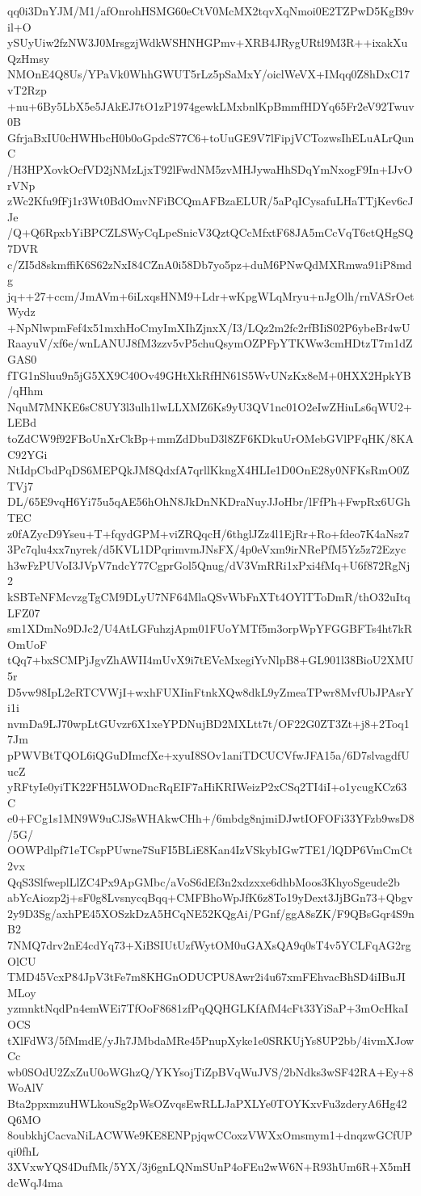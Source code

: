 qq0i3DnYJM/M1/afOnrohHSMG60eCtV0McMX2tqvXqNmoi0E2TZPwD5KgB9vil+O
ySUyUiw2fzNW3J0MrsgzjWdkWSHNHGPmv+XRB4JRygURtl9M3R++ixakXuQzHmsy
NMOnE4Q8Us/YPaVk0WhhGWUT5rLz5pSaMxY/oiclWeVX+IMqq0Z8hDxC17vT2Rzp
+nu+6By5LbX5e5JAkEJ7tO1zP1974gewkLMxbnlKpBmmfHDYq65Fr2eV92Twuv0B
GfrjaBxIU0cHWHbcH0b0oGpdcS77C6+toUuGE9V7lFipjVCTozwsIhELuALrQunC
/H3HPXovkOcfVD2jNMzLjxT92lFwdNM5zvMHJywaHhSDqYmNxogF9In+IJvOrVNp
zWc2Kfu9fFj1r3Wt0BdOmvNFiBCQmAFBzaELUR/5aPqICysafuLHaTTjKev6cJJe
/Q+Q6RpxbYiBPCZLSWyCqLpeSnicV3QztQCcMfxtF68JA5mCcVqT6ctQHgSQ7DVR
c/ZI5d8skmffiK6S62zNxI84CZnA0i58Db7yo5pz+duM6PNwQdMXRmwa91iP8mdg
jq++27+ccm/JmAVm+6iLxqsHNM9+Ldr+wKpgWLqMryu+nJgOlh/rnVASrOetWydz
+NpNlwpmFef4x51mxhHoCmyImXIhZjnxX/I3/LQz2m2fc2rfBIiS02P6ybeBr4wU
RaayuV/xf6e/wnLANUJ8fM3zzv5vP5chuQsymOZPFpYTKWw3cmHDtzT7m1dZGAS0
fTG1nSluu9n5jG5XX9C40Ov49GHtXkRfHN61S5WvUNzKx8eM+0HXX2HpkYB/qHhm
NquM7MNKE6sC8UY3l3ulh1lwLLXMZ6Ks9yU3QV1nc01O2eIwZHiuLs6qWU2+LEBd
toZdCW9f92FBoUnXrCkBp+mmZdDbuD3l8ZF6KDkuUrOMebGVlPFqHK/8KAC92YGi
NtIdpCbdPqDS6MEPQkJM8QdxfA7qrllKkngX4HLIe1D0OnE28y0NFKsRmO0ZTVj7
DL/65E9vqH6Yi75u5qAE56hOhN8JkDnNKDraNuyJJoHbr/lFfPh+FwpRx6UGhTEC
z0fAZycD9Yseu+T+fqydGPM+viZRQqcH/6thglJZz4l1EjRr+Ro+fdeo7K4aNsz7
3Pc7qlu4xx7nyrek/d5KVL1DPqrimvmJNsFX/4p0eVxm9irNRePfM5Yz5z72Ezyc
h3wFzPUVoI3JVpV7ndcY77CgprGol5Qnug/dV3VmRRi1xPxi4fMq+U6f872RgNj2
kSBTeNFMcvzgTgCM9DLyU7NF64MlaQSvWbFnXTt4OYlTToDmR/thO32uItqLFZ07
sm1XDmNo9DJc2/U4AtLGFuhzjApm01FUoYMTf5m3orpWpYFGGBFTs4ht7kROmUoF
tQq7+bxSCMPjJgvZhAWII4mUvX9i7tEVcMxegiYvNlpB8+GL901l38BioU2XMU5r
D5vw98IpL2eRTCVWjI+wxhFUXIinFtnkXQw8dkL9yZmeaTPwr8MvfUbJPAsrYi1i
nvmDa9LJ70wpLtGUvzr6X1xeYPDNujBD2MXLtt7t/OF22G0ZT3Zt+j8+2Toq17Jm
pPWVBtTQOL6iQGuDImcfXe+xyuI8SOv1aniTDCUCVfwJFA15a/6D7slvagdfUucZ
yRFtyIe0yiTK22FH5LWODncRqEIF7aHiKRIWeizP2xCSq2TI4iI+o1ycugKCz63C
e0+FCg1s1MN9W9uCJSsWHAkwCHh+/6mbdg8njmiDJwtIOFOFi33YFzb9wsD8/5G/
OOWPdlpf71eTCspPUwne7SuFI5BLiE8Kan4IzVSkybIGw7TE1/lQDP6VmCmCt2vx
QqS3SlfweplLlZC4Px9ApGMbc/aVoS6dEf3n2xdzxxe6dhbMoos3KhyoSgeude2b
abYcAiozp2j+sF0g8LvsnycqBqq+CMFBhoWpJfK6z8To19yDext3JjBGn73+Qbgv
2y9D3Sg/axhPE45XOSzkDzA5HCqNE52KQgAi/PGnf/ggA8sZK/F9QBsGqr4S9nB2
7NMQ7drv2nE4cdYq73+XiBSIUtUzfWytOM0uGAXsQA9q0sT4v5YCLFqAG2rgOlCU
TMD45VcxP84JpV3tFe7m8KHGnODUCPU8Awr2i4u67xmFEhvacBhSD4iIBuJIMLoy
yzmnktNqdPn4emWEi7TfOoF8681zfPqQQHGLKfAfM4cFt33YiSaP+3mOcHkaIOCS
tXlFdW3/5fMmdE/yJh7JMbdaMRe45PnupXyke1e0SRKUjYs8UP2bb/4ivmXJowCc
wb0SOdU2ZxZuU0oWGhzQ/YKYsojTiZpBVqWuJVS/2bNdks3wSF42RA+Ey+8WoAlV
Bta2ppxmzuHWLkouSg2pWsOZvqsEwRLLJaPXLYe0TOYKxvFu3zderyA6Hg42Q6MO
8oubkhjCacvaNiLACWWe9KE8ENPpjqwCCoxzVWXxOmsmym1+dnqzwGCfUPqi0fhL
3XVxwYQS4DufMk/5YX/3j6gnLQNmSUnP4oFEu2wW6N+R93hUm6R+X5mHdcWqJ4ma
